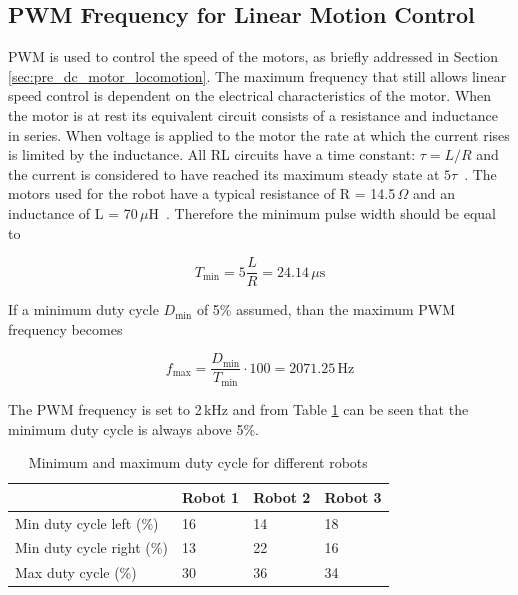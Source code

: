 \subsection{PWM Frequency for Linear Motion Control}
\label{sec:cd_pwm_frequency}

PWM is used to control the speed of the motors, as briefly addressed in Section \ref{sec:pre_dc_motor_locomotion}.
The maximum frequency that still allows linear speed control is dependent on the electrical characteristics of the motor.
When the motor is at rest its equivalent circuit consists of a resistance and inductance in series.
When voltage is applied to the motor the rate at which the current rises is limited by the inductance. 
All RL circuits have a time constant: $\tau = L / R$ and the current is considered to have reached its maximum steady state at $5\tau$~\cite{pmw_linear_motion_2017}. 
The motors used for the robot have a typical resistance of R = 14.5\,$\Omega$ and an inductance of L = 70\,$\mu$H~\cite{gearmotor_206-110_2017}.
Therefore the minimum pulse width should be equal to

\begin{equation}
T_{\min} = 5 \frac{L}{R} = 24.14\,\mu\text{s}
\end{equation}

\noindent
If a minimum duty cycle $D_{\min}$ of 5\% assumed, than the maximum PWM frequency becomes

\begin{equation}
f_{\max} = \frac{D_{\min}}{T_{\min}}\cdot 100 = 2071.25\,\text{Hz}
\end{equation}

\noindent
The PWM frequency is set to 2\,kHz and from Table \ref{tab:duty_cycle} can be seen that the minimum duty cycle is always above 5\%.

\begin{table}[t]
	\centering
	\caption{Minimum and maximum duty cycle for different robots}
	\label{tab:duty_cycle}
	\begin{tabular}{|l||l|l|l|} 
		\hline
						          & Robot 1 & Robot 2 & Robot 3 \\
		\hline \hline
 		Min duty cycle left (\%)  & 16      & 14      & 18      \\
		Min duty cycle right (\%) & 13      & 22      & 16      \\
		Max duty cycle (\%)       & 30      & 36      & 34	    \\
		\hline
	\end{tabular}
\end{table}

